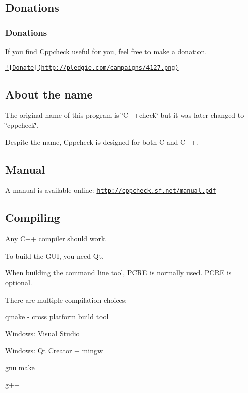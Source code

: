 \subsection*{Donations}

\subsubsection*{Donations}

If you find Cppcheck useful for you, feel free to make a donation.

\href{http://pledgie.com/campaigns/4127}{\tt !\mbox{[}Donate\mbox{]}(http\-://pledgie.\-com/campaigns/4127.\-png)}

\subsection*{About the name}

The original name of this program is \char`\"{}\-C++check\char`\"{} but it was later changed to \char`\"{}cppcheck\char`\"{}.

Despite the name, Cppcheck is designed for both C and C++.

\subsection*{Manual}

A manual is available online\-: \href{http://cppcheck.sf.net/manual.pdf}{\tt http\-://cppcheck.\-sf.\-net/manual.\-pdf}

\subsection*{Compiling}

Any C++ compiler should work.

To build the G\-U\-I, you need Qt.

When building the command line tool, P\-C\-R\-E is normally used. P\-C\-R\-E is optional.

There are multiple compilation choices\-:
\begin{DoxyItemize}
\item qmake -\/ cross platform build tool
\item Windows\-: Visual Studio
\item Windows\-: Qt Creator + mingw
\item gnu make
\item g++
\end{DoxyItemize}

